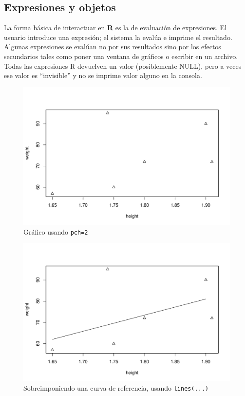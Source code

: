 \subsection{Expresiones y objetos}

La forma básica de interactuar en \textbf{R} es la de evaluación de
expresiones. El usuario introduce una expresión; el sistema la evalúa e imprime
el resultado.  Algunas expresiones se evalúan no por sus resultados sino por
los efectos secundarios tales como poner una ventana de gráficos o escribir en
un archivo. Todas las expresiones R devuelven un valor (posiblemente NULL),
pero a veces ese valor es ``invisible''  y no se imprime valor alguno en la
consola.

\begin{figure}[H]
    \includegraphics[width=\linewidth]{img/fig-3.pdf}
    \caption{Gráfico usando \texttt{pch=2}}
    \label{fig-3}
 \end{figure}


 \begin{figure}[H]
    \includegraphics[width=\linewidth]{img/fig-4.pdf}
	\caption{Sobreimponiendo una curva de referencia, usando \texttt{lines(...)}}
    \label{fig-4}
 \end{figure}

